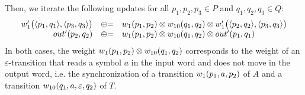 \noindent
Then, we iterate the following updates for all $p_1, p_2, p_3\in P$ and $q_1, q_2, q_3 \in Q$:
\[
\begin{array}{rcl}
\wei'_1\bigl( \< p_1, q_1>, \< p_3, q_3>\bigr) & \opluseq &
\wei_{1}(p_1, p_2)
\otimes \wei_{10}(q_1, q_2)
\otimes \wei'_1\bigl( \< p_2, q_2>, \< p_3, q_3>\bigr)\\
%
\final'(p_2, q_2) & \opluseq &
\wei_{1}(p_1, p_2)
\otimes \wei_{10}(q_1, q_2)
\otimes \final'(p_1, q_1)
\end{array}
\]
In both cases, 
the weight $\wei_{1}(p_1, p_2) \otimes \wei_{10}(q_1, q_2)$
corresponds to the weight of an $\varepsilon$-transition 
that reads a symbol $a$ in the input word and does not move in the output word,
i.e. the synchronization of 
a transition $\wei_{1}(p_1, a, p_2)$ of $A$ and 
a transition $\wei_{10}(q_1, a, \varepsilon, q_2)$ of $T$.

